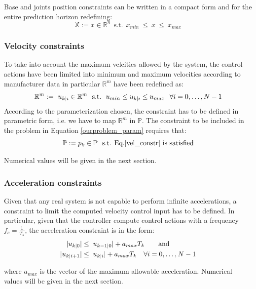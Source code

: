 	Base and joints position constraints can be written in a compact form and for the entire prediction horizon redefining: 
	\begin{equation}
	\mathbb{X}:= x \in \mathbb{R}^{n}\ \ \text{s.t.}\ \  {x}_{min}\ \leq\ x\ \leq\ {x}_{max}
	\end{equation}

\subsubsection*{Velocity constraints}
	To take into account the maximum velcities allowed by the system, the control actions have been limited into minimum and maximum velocities according to manufacturer data in particular $\mathbb{R}^m$ have been redefined as:
	\begin{equation}
	\mathbb{R}^m:=\ {u}_{k|i} \in \mathbb{R}^m\ \ \textnormal{s.t.}\ \ u_{min}\leq{u_{k|i}}\leq u_{max}\ \ \forall i=0,\dots, N-1
	\label{vel_constr}
	\end{equation}
	According to the parameterization chosen, the constraint has to be defined in parametric form, i.e. we have to map $\mathbb{R}^m$ in $\mathbb{P}$. The constraint to be included in the problem in Equation \ref{ourproblem_param} requires that:
	\begin{equation*}
		\mathbb{P}:=p_k \in \mathbb{P}\ \textnormal{ s.t. Eq.\ref{vel_constr} is satisfied}
	\end{equation*}

	Numerical values will be given in the next section.
\subsubsection*{Acceleration constraints}
	Given that any real system is not capable to perform infinite accelerations, a constraint to limit the computed velocity control input has to be defined. In particular, given that the controller compute control actions with a frequency $f_c=\frac{1}{T_k}$, the acceleration constraint is in the form:
	\begin{equation}
		\begin{split}
			\lvert u_{k|0}\rvert &\leq \lvert u_{k-1|0}\rvert + a_{max} T_k\qquad \textnormal{and}\\
			\lvert u_{k|i+1}\rvert &\leq \lvert u_{k|i}\rvert + a_{max} T_k\quad  \forall i=0,\dots,N-1
		\end{split}	
	\end{equation}  

	where $a_{max}$ is the vector of the maximum allowable acceleration. Numerical values will be given in the next section. 


